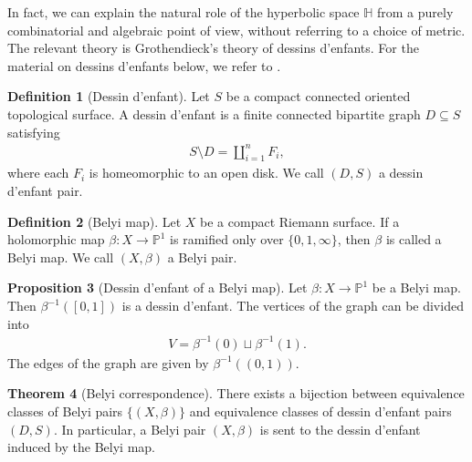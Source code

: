 \documentclass[10pt, a4paper]{article}
\renewcommand{\P}{\mathbb{P}}
\newcommand{\HH}{\mathbb{H}} %
\theoremstyle{definition}
\newtheorem{theorem}{Theorem}[section]
\newtheorem{proposition}[theorem]{Proposition}
\newtheorem{definition}[theorem]{Definition}
\theoremstyle{remark}
\begin{document}
In fact, we can explain the natural role of the hyperbolic space \(\HH\) from a purely combinatorial and algebraic point of view, without referring to a choice of metric. The relevant theory is Grothendieck's theory of dessins d'enfants.
For the material on dessins d'enfants below, we refer to \cite{GirondoGonzalezDiez2012}.

\begin{definition}[Dessin d'enfant]
Let \(S\) be a compact connected oriented topological surface. A dessin d'enfant is a finite connected bipartite graph \(D\subseteq S\) satisfying
\begin{align*}
    S\setminus D = \coprod_{i=1}^n F_i, 
\end{align*}
where each \(F_i\) is homeomorphic to an open disk. We call \((D,S)\) a dessin d'enfant pair.
\end{definition}

\begin{definition}[Belyi map]
    Let \(X\) be a compact Riemann surface. If a holomorphic map \(\beta:X\to \P^1\) is ramified only over \(\{0,1,\infty\}\), then \(\beta\) is called a Belyi map.
    We call \((X,\beta)\) a Belyi pair.
\end{definition}

\begin{proposition}[Dessin d'enfant of a Belyi map]
    Let \(\beta:X\to \P^1\) be a Belyi map. Then \(\beta^{-1}([0,1])\) is a dessin d'enfant.
    The vertices of the graph can be divided into
    \begin{align*}
        V = \beta^{-1}(0)\sqcup \beta^{-1}(1).
    \end{align*}
    The edges of the graph are given by \(\beta^{-1}((0, 1))\).
\end{proposition}

\begin{theorem}[Belyi correspondence]{\label{Belyi}}
There exists a bijection between equivalence classes of Belyi pairs \(\{(X,\beta)\}\) and equivalence classes of dessin d'enfant pairs \((D,S)\).
In particular, a Belyi pair \((X,\beta)\) is sent to the dessin d'enfant induced by the Belyi map.
\end{theorem}
\end{document}
